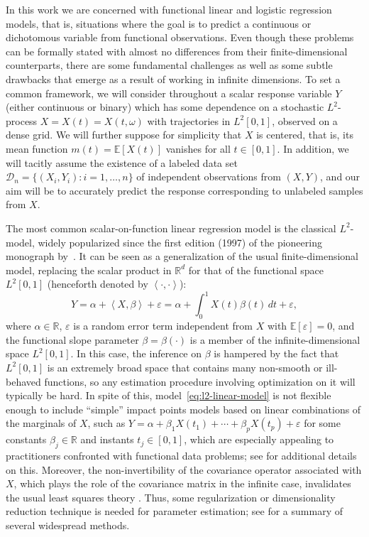 \documentclass{article}
\numberwithin{equation}{section}
\theoremstyle{plain}
\theoremstyle{definition}
\renewcommand{\epsilon}{\varepsilon}
\newcommand{\R}{\mathbb{R}}
\newcommand{\E}{\mathbb{E}}
\newcommand\dotprod[2]{\left\langle#1,#2\right\rangle}
\begin{document}
In this work we are concerned with functional linear and logistic regression models, that is, situations where the goal is to predict a continuous or dichotomous variable from functional observations. Even though these problems can be formally stated with almost no differences from their finite-dimensional counterparts, there are some fundamental challenges as well as some subtle drawbacks that emerge as a result of working in infinite dimensions. To set a common framework, we will consider throughout a scalar response variable \(Y\) (either continuous or binary) which has some dependence on a stochastic \(L^2\)-process \(X=X(t)=X(t, \omega)\) with trajectories in \(L^2[0, 1]\), observed on a dense grid. We will further suppose for simplicity that \(X\) is centered, that is, its mean function \(m(t)=\E[X(t)]\) vanishes for all \(t\in[0,1]\). In addition, we will tacitly assume the existence of a labeled data set \(\mathcal D_n =\{(X_i, Y_i): i=1,\dots, n\}\) of independent observations from \((X, Y)\), and our aim will be to accurately predict the response corresponding to unlabeled samples from \(X\).

The most common scalar-on-function linear regression model is the classical \(L^2\)-model, widely popularized since the first edition (1997) of the pioneering monograph by~\citet{ramsay2005functional}. It can be seen as a generalization of the usual finite-dimensional model, replacing the scalar product in \(\R^d\) for that of the functional space \(L^2[0,1]\) (henceforth denoted by \(\dotprod{\cdot}{\cdot}\)):
\begin{equation}\label{eq:l2-linear-model}
  Y = \alpha + \dotprod{X}{\beta} + \epsilon = \alpha + \int_0^1 X(t)\beta(t)\, dt + \epsilon,
\end{equation}
where \(\alpha\in \R\), \(\epsilon\) is a random error term independent from \(X\) with \(\E [\epsilon]=0\), and the functional slope parameter \(\beta=\beta(\cdot)\) is a member of the infinite-dimensional space \(L^2[0, 1]\). In this case, the inference on \(\beta\) is hampered by the fact that \(L^2[0,1]\) is an extremely broad space that contains many non-smooth or ill-behaved functions, so any estimation procedure involving optimization on it will typically be hard. In spite of this, model~\eqref{eq:l2-linear-model} is not flexible enough to include ``simple'' impact points models based on linear combinations of the marginals of \(X\), such as \(Y=\alpha + \beta_1 X(t_1)+ \cdots + \beta_p X(t_p) + \epsilon\) for some constants \(\beta_j\in\R\) and instants \(t_j\in[0,1]\), which are especially appealing to practitioners confronted with functional data problems; see \citet{berrendero2024functional} for additional details on this. Moreover, the non-invertibility of the covariance operator associated with \(X\), which plays the role of the covariance matrix in the infinite case, invalidates the usual least squares theory \citep{cardot2011functional}. Thus, some regularization or dimensionality reduction technique is needed for parameter estimation; see \citet{reiss2017methods} for a summary of several widespread methods.
\end{document}
